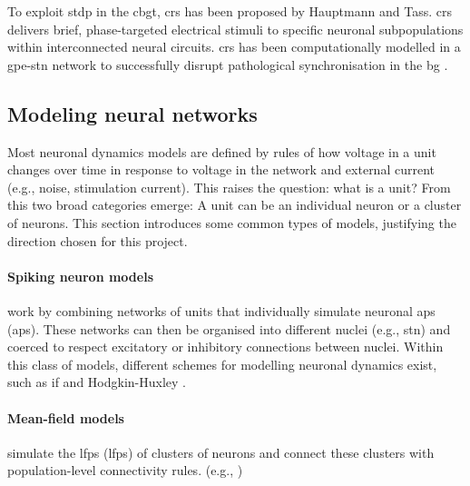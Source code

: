 To exploit \acrshort{stdp} in the \acrshort{cbgt}, \acrfull{crs} has been proposed by Hauptmann and Tass.
\acrshort{crs} delivers brief, phase-targeted electrical stimuli to specific neuronal subpopulations within interconnected
neural circuits.
\acrshort{crs} has been computationally modelled in a \acrfull{gpe}-\acrshort{stn} network to successfully disrupt pathological
synchronisation in the \acrshort{bg} \cite{hauptmann2009cumulative, hauptmann2010restoration}.

\subsection{Modeling neural networks}
Most neuronal dynamics models are defined by rules of how voltage in a unit changes
over time in response to voltage in the network and external current (e.g., noise, stimulation
current).
This raises the question: what is a unit? From this two broad categories emerge: A unit can be an individual neuron or a cluster of neurons. This section introduces
some common types of models, justifying the direction chosen for this project.

\paragraph{Spiking neuron models} work by combining networks of units that individually
simulate neuronal \acrlong{ap}s (\acrshort{ap}s).
These networks can then be organised into different nuclei (e.g., \acrshort{stn}) and coerced to respect
excitatory or inhibitory connections between nuclei.
Within this class of models, different schemes for modelling neuronal dynamics exist,
such as \acrfull{if} \cite{gerstner2014if} and Hodgkin-Huxley
\cite{hodgkin1952measurement, gerstner2014hh}.

\paragraph{Mean-field models} simulate the \acrlong{lfp}s (\acrshort{lfp}s) of clusters of neurons
and connect these clusters with population-level connectivity rules. (e.g.,
\cite{jansen1995electroencephalogram, west2022stimulating})

